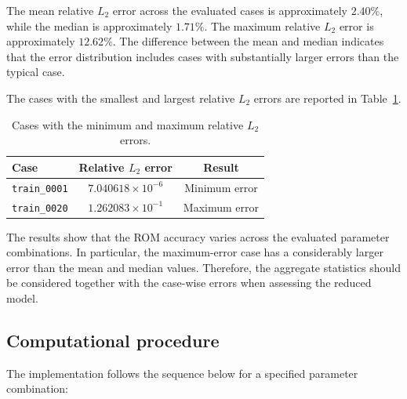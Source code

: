 The mean relative $L_2$ error across the evaluated cases
is approximately $2.40\%$, while the median is
approximately $1.71\%$. The maximum relative $L_2$ error
is approximately $12.62\%$. The difference between the
mean and median indicates that the error distribution
includes cases with substantially larger errors than
the typical case.

The cases with the smallest and largest relative
$L_2$ errors are reported in
Table~\ref{tab:rom_error_extremes}.

\begin{table}[htbp]
    \centering
    \caption{Cases with the minimum and maximum relative
    $L_2$ errors.}
    \label{tab:rom_error_extremes}
    \begin{tabular}{lcc}
        \toprule
        \textbf{Case} &
        \textbf{Relative $L_2$ error} &
        \textbf{Result} \\
        \midrule
        \texttt{train\_0001} &
        $7.040618\times10^{-6}$ &
        Minimum error \\
        \texttt{train\_0020} &
        $1.262083\times10^{-1}$ &
        Maximum error \\
        \bottomrule
    \end{tabular}
\end{table}

The results show that the ROM accuracy varies across the
evaluated parameter combinations. In particular, the
maximum-error case has a considerably larger error than
the mean and median values. Therefore, the aggregate
statistics should be considered together with the
case-wise errors when assessing the reduced model.

\subsection{Computational procedure}

The implementation follows the sequence below for a
specified parameter combination:

